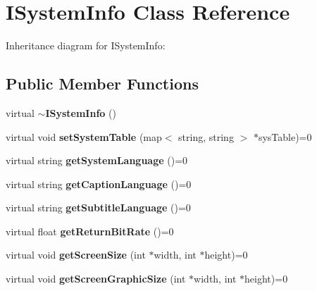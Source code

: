 \section{ISystemInfo Class Reference}
\label{classbr_1_1pucrio_1_1telemidia_1_1ginga_1_1core_1_1contextmanager_1_1ISystemInfo}
Inheritance diagram for ISystemInfo:\subsection*{Public Member Functions}
\begin{CompactItemize}
\item 
virtual {\bf $\sim$ISystemInfo} ()\label{classbr_1_1pucrio_1_1telemidia_1_1ginga_1_1core_1_1contextmanager_1_1ISystemInfo_add86190f75706e32af5d8f88d9ab997}

\item 
virtual void \textbf{setSystemTable} (map$<$ string, string $>$ $\ast$sysTable)=0\label{classbr_1_1pucrio_1_1telemidia_1_1ginga_1_1core_1_1contextmanager_1_1ISystemInfo_e55735098e09df7f3be9ac787cbe38a7}

\item 
virtual string \textbf{getSystemLanguage} ()=0\label{classbr_1_1pucrio_1_1telemidia_1_1ginga_1_1core_1_1contextmanager_1_1ISystemInfo_9f5bff69be775f6243a432dbd080ffaa}

\item 
virtual string \textbf{getCaptionLanguage} ()=0\label{classbr_1_1pucrio_1_1telemidia_1_1ginga_1_1core_1_1contextmanager_1_1ISystemInfo_0d9b86b9e56fefb5c5a7f8f1f2ca00fb}

\item 
virtual string \textbf{getSubtitleLanguage} ()=0\label{classbr_1_1pucrio_1_1telemidia_1_1ginga_1_1core_1_1contextmanager_1_1ISystemInfo_9329dfcf878ad6220c5584b63ff0fba2}

\item 
virtual float \textbf{getReturnBitRate} ()=0\label{classbr_1_1pucrio_1_1telemidia_1_1ginga_1_1core_1_1contextmanager_1_1ISystemInfo_b93f6ebf228f54c95b822d53d8f5f118}

\item 
virtual void \textbf{getScreenSize} (int $\ast$width, int $\ast$height)=0\label{classbr_1_1pucrio_1_1telemidia_1_1ginga_1_1core_1_1contextmanager_1_1ISystemInfo_b918e49d3160279b156b241fc3bbf203}

\item 
virtual void \textbf{getScreenGraphicSize} (int $\ast$width, int $\ast$height)=0\label{classbr_1_1pucrio_1_1telemidia_1_1ginga_1_1core_1_1contextmanager_1_1ISystemInfo_b9f0e80a0233469c02093f409b6e7a6f}


\end{CompactItemize}

